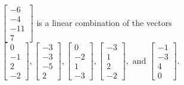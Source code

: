 \begin{exercise}
\begin{exerciseStatement}
  \end{exerciseStatement}
  \begin{exerciseAnswer}
   \(\left[\begin{array}{c}
-6 \\
-4 \\
-11 \\
7
\end{array}\right]\) 
  	 is  
	a linear combination of the vectors \(\left[\begin{array}{c}
0 \\
-1 \\
2 \\
-2
\end{array}\right] , \left[\begin{array}{c}
-3 \\
-3 \\
-5 \\
2
\end{array}\right] , \left[\begin{array}{c}
0 \\
-2 \\
1 \\
-3
\end{array}\right] , \left[\begin{array}{c}
-3 \\
1 \\
2 \\
-2
\end{array}\right] , \text{ and } \left[\begin{array}{c}
-1 \\
-3 \\
4 \\
0
\end{array}\right]\).

	
  


  \end{exerciseAnswer}
\end{exercise}